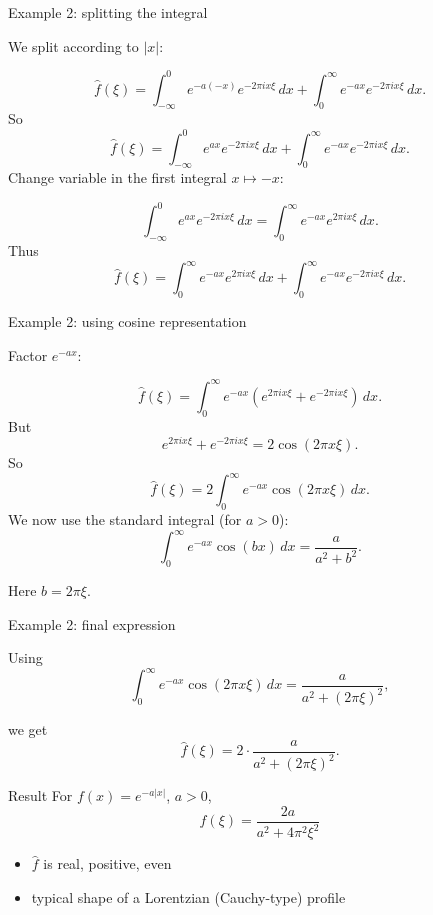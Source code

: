 \documentclass[aspectratio=169]{beamer}
\begin{document}
\begin{frame}{Example 2: splitting the integral}

We split according to $|x|$:

\[
\hat f(\xi)
=
\int_{-\infty}^{0} e^{-a(-x)}e^{-2\pi i x\xi}\,dx
+
\int_{0}^{\infty} e^{-ax}e^{-2\pi i x\xi}\,dx.
\]
\pause
So
\[
\hat f(\xi)
=
\int_{-\infty}^{0} e^{ax}e^{-2\pi i x\xi}\,dx
+
\int_{0}^{\infty} e^{-ax}e^{-2\pi i x\xi}\,dx.
\]
\pause
Change variable in the first integral $x\mapsto -x$:

\[
\int_{-\infty}^{0} e^{ax}e^{-2\pi i x\xi}\,dx
=
\int_{0}^{\infty} e^{-ax}e^{2\pi i x\xi}\,dx.
\]
\pause
Thus
\[
\hat f(\xi)
=
\int_{0}^{\infty} e^{-ax}e^{2\pi i x\xi}\,dx
+
\int_{0}^{\infty} e^{-ax}e^{-2\pi i x\xi}\,dx.
\]

\end{frame}

\begin{frame}{Example 2: using cosine representation}

Factor $e^{-ax}$:

\[
\hat f(\xi)
=
\int_{0}^{\infty} e^{-ax}
\left(e^{2\pi i x\xi}+e^{-2\pi i x\xi}\right)\,dx.
\]
\pause
But
\[
e^{2\pi i x\xi}+e^{-2\pi i x\xi}=2\cos(2\pi x\xi).
\]
\pause
So
\[
\hat f(\xi)
=2\int_{0}^{\infty} e^{-ax}\cos(2\pi x\xi)\,dx.
\]
\pause
We now use the standard integral (for $a>0$):
\[
\int_{0}^{\infty} e^{-ax}\cos(bx)\,dx
=
\frac{a}{a^2+b^2}.
\]

Here $b=2\pi\xi$.
\end{frame}

\begin{frame}{Example 2: final expression}

Using
\[
\int_{0}^{\infty} e^{-ax}\cos(2\pi x\xi)\,dx
=
\frac{a}{a^2+(2\pi\xi)^2},
\]

we get
\[
\hat f(\xi)
=
2\cdot \frac{a}{a^2+(2\pi\xi)^2}.
\]
\pause
\begin{block}{Result}
For $f(x)=e^{-a|x|}$, $a>0$,
\[
\boxed{
\hat f(\xi)=\frac{2a}{a^2+4\pi^2\xi^2}
}
\]

\end{block}
\pause
\begin{itemize}
    \item $\hat f$ is real, positive, even
    \item typical shape of a Lorentzian (Cauchy-type) profile
\end{itemize}

\end{frame}
\end{document}
